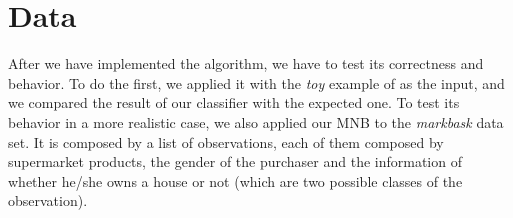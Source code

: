 \section{Data}
\label{sec:data}

After we have implemented the algorithm, we have to test its correctness and behavior. To do the first, we applied it with the \textit{toy} example of \cite{slides} as the input, and we compared the result of our classifier with the expected one. To test its behavior in a more realistic case, we also applied our MNB to the \textit{markbask} data set. It is composed by a list of observations, each of them composed by supermarket products, the gender of the purchaser and the information of whether he/she owns a house or not (which are two possible classes of the observation).